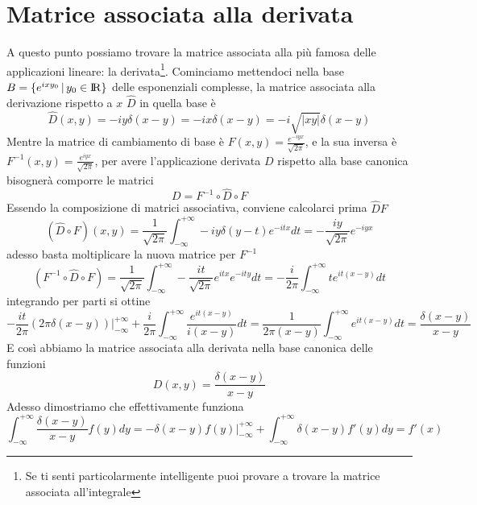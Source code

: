 \documentclass[11pt,a4paper]{article}
\theoremstyle{definition}
\theoremstyle{plain}
\theoremstyle{plain}
\begin{document}
	\section{Matrice associata alla derivata}
		A questo punto possiamo trovare la matrice associata alla più famosa delle applicazioni lineare: la derivata\footnote{Se ti senti particolarmente intelligente puoi provare a trovare la matrice associata all'integrale}.\newline
		Cominciamo mettendoci nella base $B=\{e^{ixy_0}\,|\,y_0 \in \rm I\!R \}$ delle esponenziali complesse, la matrice associata alla derivazione rispetto a $x$ $\widehat{D}$ in quella base è 
		\begin{equation}
			\widehat{D}(x,y)=-iy\delta (x-y)=-ix\delta(x-y)=-i\sqrt{|xy|}\delta(x-y)
		\end{equation}
		Mentre la matrice di cambiamento di base è $F(x,y)=\frac{e^{-iyx}}{\sqrt{2\pi}}$, e la sua inversa è $F^{-1}(x,y)=\frac{e^{iyx}}{\sqrt{2\pi}}$, per avere l'applicazione derivata $D$ rispetto alla base canonica bisognerà comporre le matrici
		\begin{equation}
			D=F^{-1}\circ \widehat{D}\circ F
		\end{equation}
		Essendo la composizione di matrici associativa, conviene calcolarci prima $\widehat{D}F$
		\[
			(\widehat{D}\circ F)(x,y)=\frac{1}{\sqrt{2\pi}}\int_{-\infty}^{+\infty}
			-iy\delta(y-t)e^{-itx}dt=-\frac{iy}{\sqrt{2\pi}}e^{-iyx}
		\]
		adesso basta moltiplicare la nuova matrice per $F^{-1}$
		\[
			(F^{-1}\circ \widehat{D}\circ F)=
			\frac{1}{\sqrt{2\pi}}\int_{-\infty}^{+\infty}-\frac{it}{\sqrt{2\pi}}e^{itx}e^{-ity}dt=
			-\frac{i}{2\pi}\int_{-\infty}^{+\infty}te^{it(x-y)}dt
		\]
		integrando per parti si ottine
		\[
			-\frac{it}{2\pi}(2\pi\delta(x-y))\bigg\rvert_{-\infty}^{+\infty}+
			\frac{i}{2\pi}\int_{-\infty}^{+\infty}\frac{e^{it(x-y)}}{i(x-y)}dt=
			\frac{1}{2\pi(x-y)}\int_{-\infty}^{+\infty}e^{it(x-y)}dt=\frac{\delta(x-y)}{x-y}
		\]
		E così abbiamo la matrice associata alla derivata nella base canonica delle funzioni
		\begin{equation}
			D(x,y)=\frac{\delta(x-y)}{x-y}
		\end{equation}
		Adesso dimostriamo che effettivamente funziona
		\[
			\int_{-\infty}^{+\infty}\frac{\delta(x-y)}{x-y}f(y)dy=-\delta(x-y)f(y)\big\rvert_{-\infty}^{+\infty}+\int_{-\infty}^{+\infty}\delta(x-y)f'(y)dy=f'(x)
		\]
\end{document}
